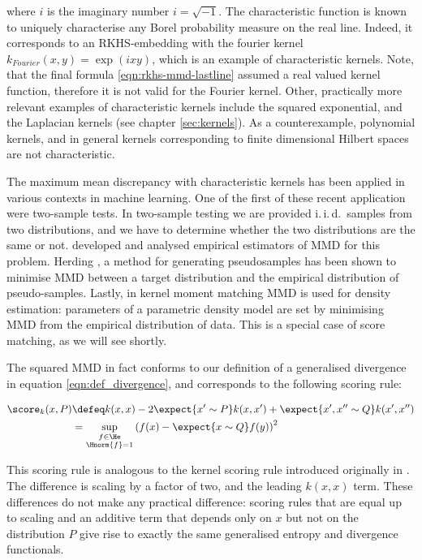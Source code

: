 where $i$ is the imaginary number $i=\sqrt{-1}$. The characteristic function is known to uniquely characterise any Borel probability measure on the real line. Indeed, it corresponds to an RKHS-embedding with the fourier kernel $k_{Fourier}(x,y) = \exp(ixy)$, which is an example of characteristic kernels. Note, that the final formula \ref{eqn:rkhs-mmd-lastline} assumed a real valued kernel function, therefore it is not valid for the Fourier kernel. Other, practically more relevant examples of characteristic kernels include the squared exponential, and the Laplacian kernels (see chapter \ref{sec:kernels}). As a counterexample, polynomial kernels, and in general kernels corresponding to finite dimensional Hilbert spaces are not characteristic.

The maximum mean discrepancy with characteristic kernels has been applied in various contexts in machine learning. One of the first of these recent application were two-sample tests. In two-sample testing we are provided i.\,i.\,d.\ samples from two distributions, and we have to determine whether the two distributions are the same or not. \citep{Gretton2012,Gretton2009} developed and analysed empirical estimators of MMD for this problem. Herding \citep{Welling2009,Chen2012}, a method for generating pseudosamples has been shown to minimise MMD between a target distribution and the empirical distribution of pseudo-samples. Lastly, in kernel moment matching \citep{Song2008} MMD is used for density estimation: parameters of a parametric density model are set by minimising MMD from the empirical distribution of data. This is a special case of score matching, as we will see shortly.

The squared MMD in fact conforms to our definition of a generalised divergence in equation \eqref{eqn:def_divergence}, and corresponds to the following scoring rule:

\begin{align}
	\score_{k}(x,P) &\defeq k(x,x) - 2 \expect{x'\sim P} k(x,x') + \expect{x',x''\sim Q}k(x',x'')\\
		&=  \sup_{\substack{f\in\He\\\Hnorm{f}=1}}\left( f(x)- \expect{x\sim Q} f(y) \right)^2
\end{align}

This scoring rule is analogous to the kernel scoring rule introduced originally in \citep{DawidAncientpaper}. The difference is scaling by a factor of two, and the leading $k(x,x)$ term. These differences do not make any practical difference: scoring rules that are equal up to scaling and an additive term that depends only on $x$ but not on the distribution $P$ give rise to exactly the same generalised entropy and divergence functionals.


